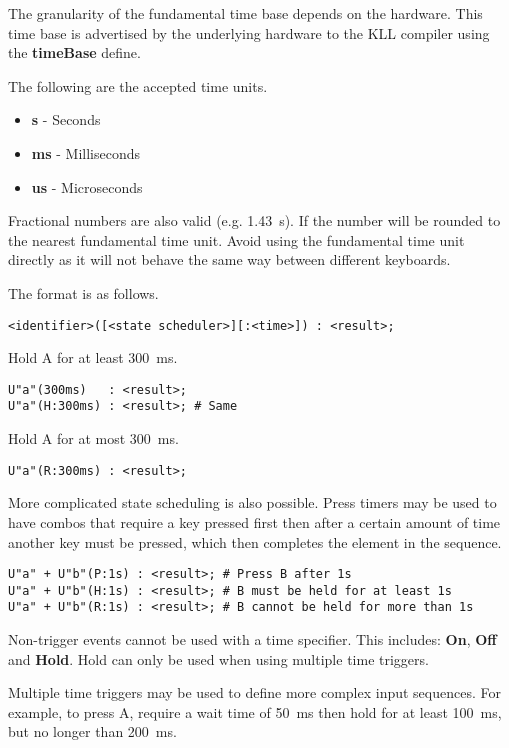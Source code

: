 \documentclass{kiibohd-template}
\begin{document}
The granularity of the fundamental time base depends on the hardware.
This time base is advertised by the underlying hardware to the KLL compiler using the \textbf{timeBase} define.

The following are the accepted time units.
\begin{itemize}
	\item \textbf{s} - Seconds
	\item \textbf{ms} - Milliseconds
	\item \textbf{us} - Microseconds
\end{itemize}

Fractional numbers are also valid (e.g. 1.43~s).
If the number will be rounded to the nearest fundamental time unit.
Avoid using the fundamental time unit directly as it will not behave the same way between different keyboards.

The format is as follows.

\begin{lstlisting}
<identifier>([<state scheduler>][:<time>]) : <result>;
\end{lstlisting}

Hold A for at least 300~ms.

\begin{lstlisting}
U"a"(300ms)   : <result>;
U"a"(H:300ms) : <result>; # Same
\end{lstlisting}

Hold A for at most 300~ms.

\begin{lstlisting}
U"a"(R:300ms) : <result>;
\end{lstlisting}

More complicated state scheduling is also possible.
Press timers may be used to have combos that require a key pressed first then after a certain amount of time another key must be pressed, which then completes the element in the sequence.

\begin{lstlisting}
U"a" + U"b"(P:1s) : <result>; # Press B after 1s
U"a" + U"b"(H:1s) : <result>; # B must be held for at least 1s
U"a" + U"b"(R:1s) : <result>; # B cannot be held for more than 1s
\end{lstlisting}

Non-trigger events cannot be used with a time specifier.
This includes: \textbf{On}, \textbf{Off} and \textbf{Hold}.
Hold can only be used when using multiple time triggers.

Multiple time triggers may be used to define more complex input sequences.
For example, to press A, require a wait time of 50~ms then hold for at least 100~ms, but no longer than 200~ms.
\end{document}
